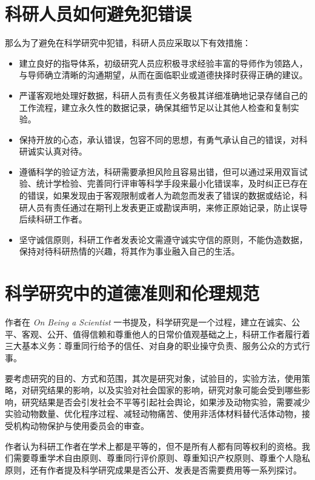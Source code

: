 \documentclass[12pt, hyperref, a4paper, UTF8]{ctexart}
\begin{document}
\section{科研人员如何避免犯错误}
那么为了避免在科学研究中犯错，科研人员应采取以下有效措施：

\begin{itemize}
    \item 建立良好的指导体系，初级研究人员应积极寻求经验丰富的导师作为领路人，与导师确立清晰的沟通期望，从而在面临职业或道德抉择时获得正确的建议。
    \item 严谨客观地处理好数据，科研人员有责任义务极其详细准确地记录存储自己的工作流程，建立永久性的数据记录，确保其细节足以让其他人检查和复制实验。
    \item 保持开放的心态，承认错误，包容不同的思想，有勇气承认自己的错误，对科研诚实认真对待。
    \item 遵循科学的验证方法，科研需要承担风险且容易出错，但可以通过采用双盲试验、统计学检验、完善同行评审等科学手段来最小化错误率，及时纠正已存在的错误，如果发现由于客观限制或者人为疏忽而发表了错误的数据或结论，科研人员有责任通过在期刊上发表更正或勘误声明，来修正原始记录，防止误导后续科研工作者。
    \item 坚守诚信原则，科研工作者发表论文需遵守诚实守信的原则，不能伪造数据，保持对待科研热情的兴趣，将其作为事业融入自己的生活。
\end{itemize}



\section{科学研究中的道德准则和伦理规范}
作者在 \textit{On Being a Scientist} 一书提及，科学研究是一个过程，建立在诚实、公平、客观、公开、值得信赖和尊重他人的日常价值观基础之上，科研工作者履行着三大基本义务：尊重同行给予的信任、对自身的职业操守负责、服务公众的方式行事。

要考虑研究的目的、方式和范围，其次是研究对象，试验目的，实验方法，使用策略，对研究结果的影响，以及实验对社会国家的影响，研究对象可能会受到哪些影响，研究结果是否会引发社会不平等引起社会舆论，如果涉及动物实验，需要减少实验动物数量、优化程序过程、减轻动物痛苦、使用非活体材料替代活体动物，接受机构动物保护与使用委员会的审查。

作者认为科研工作者在学术上都是平等的，但不是所有人都有同等权利的资格。我们需要尊重学术自由原则、尊重同行评价原则、尊重知识产权原则、尊重个人隐私原则，还有作者提及科学研究成果是否公开、发表是否需要费用等一系列探讨。
\end{document}
